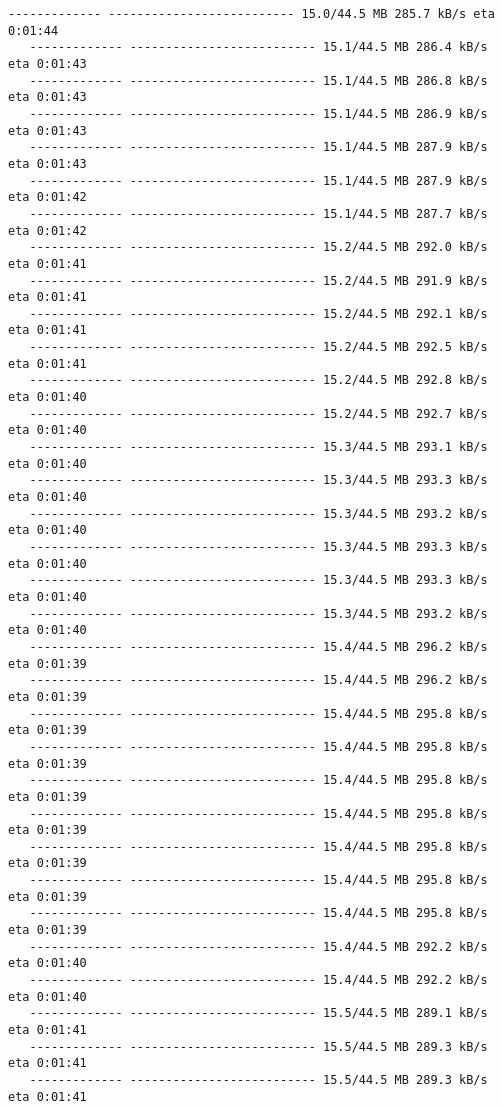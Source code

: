 \documentclass[11pt]{article}
\begin{document}
\begin{Verbatim}[commandchars=\\\{\}]
   ------------- -------------------------- 15.0/44.5 MB 285.7 kB/s eta 0:01:44
   ------------- -------------------------- 15.1/44.5 MB 286.4 kB/s eta 0:01:43
   ------------- -------------------------- 15.1/44.5 MB 286.8 kB/s eta 0:01:43
   ------------- -------------------------- 15.1/44.5 MB 286.9 kB/s eta 0:01:43
   ------------- -------------------------- 15.1/44.5 MB 287.9 kB/s eta 0:01:43
   ------------- -------------------------- 15.1/44.5 MB 287.9 kB/s eta 0:01:42
   ------------- -------------------------- 15.1/44.5 MB 287.7 kB/s eta 0:01:42
   ------------- -------------------------- 15.2/44.5 MB 292.0 kB/s eta 0:01:41
   ------------- -------------------------- 15.2/44.5 MB 291.9 kB/s eta 0:01:41
   ------------- -------------------------- 15.2/44.5 MB 292.1 kB/s eta 0:01:41
   ------------- -------------------------- 15.2/44.5 MB 292.5 kB/s eta 0:01:41
   ------------- -------------------------- 15.2/44.5 MB 292.8 kB/s eta 0:01:40
   ------------- -------------------------- 15.2/44.5 MB 292.7 kB/s eta 0:01:40
   ------------- -------------------------- 15.3/44.5 MB 293.1 kB/s eta 0:01:40
   ------------- -------------------------- 15.3/44.5 MB 293.3 kB/s eta 0:01:40
   ------------- -------------------------- 15.3/44.5 MB 293.2 kB/s eta 0:01:40
   ------------- -------------------------- 15.3/44.5 MB 293.3 kB/s eta 0:01:40
   ------------- -------------------------- 15.3/44.5 MB 293.3 kB/s eta 0:01:40
   ------------- -------------------------- 15.3/44.5 MB 293.2 kB/s eta 0:01:40
   ------------- -------------------------- 15.4/44.5 MB 296.2 kB/s eta 0:01:39
   ------------- -------------------------- 15.4/44.5 MB 296.2 kB/s eta 0:01:39
   ------------- -------------------------- 15.4/44.5 MB 295.8 kB/s eta 0:01:39
   ------------- -------------------------- 15.4/44.5 MB 295.8 kB/s eta 0:01:39
   ------------- -------------------------- 15.4/44.5 MB 295.8 kB/s eta 0:01:39
   ------------- -------------------------- 15.4/44.5 MB 295.8 kB/s eta 0:01:39
   ------------- -------------------------- 15.4/44.5 MB 295.8 kB/s eta 0:01:39
   ------------- -------------------------- 15.4/44.5 MB 295.8 kB/s eta 0:01:39
   ------------- -------------------------- 15.4/44.5 MB 295.8 kB/s eta 0:01:39
   ------------- -------------------------- 15.4/44.5 MB 292.2 kB/s eta 0:01:40
   ------------- -------------------------- 15.4/44.5 MB 292.2 kB/s eta 0:01:40
   ------------- -------------------------- 15.5/44.5 MB 289.1 kB/s eta 0:01:41
   ------------- -------------------------- 15.5/44.5 MB 289.3 kB/s eta 0:01:41
   ------------- -------------------------- 15.5/44.5 MB 289.3 kB/s eta 0:01:41

\end{Verbatim}
\end{document}
